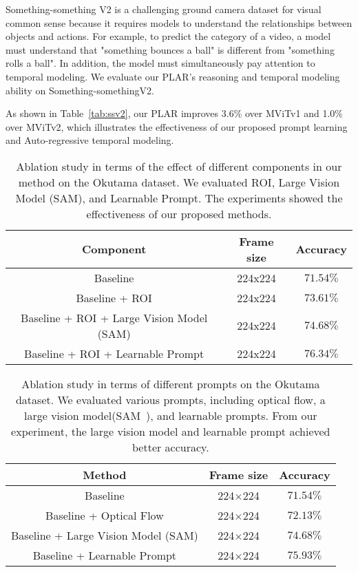 \documentclass[letterpaper, 10 pt, conference]{ieeeconf}
\begin{document}
Something-something V2 is a challenging ground camera dataset for visual common sense because it requires models to understand the relationships between objects and actions. For example, to predict the category of a video, a model must understand that "something bounces a ball" is different from "something rolls a ball". In addition, the model must simultaneously pay attention to temporal modeling. We evaluate our PLAR's reasoning and temporal modeling ability on Something-somethingV2.

As shown in Table~\ref{tab:ssv2},  our PLAR improves 3.6\% over MViTv1 and 1.0\% over MViTv2, which illustrates the effectiveness of our proposed prompt learning and Auto-regressive temporal modeling. 


\begin{table}[h]
\centering
\begin{tabular}{c c c }
\toprule
Component & Frame size  & Accuracy    \\
\midrule
Baseline & 224x224 & $71.54\%$  \\
Baseline + ROI  & 224x224 & $73.61\%$  \\
Baseline + ROI + Large Vision Model (SAM) & 224x224 & $74.68\%$  \\
Baseline + ROI + Learnable Prompt & 224x224 & $76.34\%$  \\
\bottomrule
\end{tabular}
\caption{Ablation study in terms of the effect of different components in our method on the Okutama dataset. We evaluated ROI, Large Vision Model (SAM), and Learnable Prompt. The experiments showed the effectiveness of our proposed methods.}
\label{tab:component}
\vspace{-3mm}
\end{table} \begin{table}[h!]
\centering
\begin{tabular}{c c c }
\toprule
Method & Frame size  & Accuracy    \\
\midrule
Baseline & 224$\times$224 & $71.54\%$  \\
Baseline + Optical Flow & 224$\times$224 & $72.13\%$  \\
Baseline + Large Vision Model (SAM) & 224$\times$224 & $74.68\%$  \\
Baseline + Learnable Prompt & 224$\times$224 & $75.93\%$  \\
\bottomrule
\end{tabular}
\caption{Ablation study in terms of different prompts on the Okutama dataset. We evaluated various prompts, including optical flow, a large vision model(SAM~\cite{kirillov2023segment}), and learnable prompts. From our experiment, the large vision model and learnable prompt achieved better accuracy.}
\label{tab:prompt}
\vspace{-3mm}
\end{table} 
\end{document}
